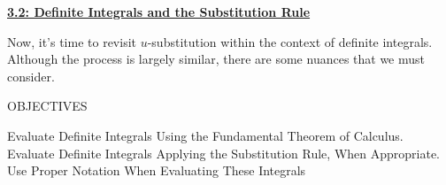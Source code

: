 \textbf{\underline{\large{3.2: Definite Integrals and the Substitution Rule}}} \par

Now, it's time to revisit $u$-substitution within the context of definite integrals. Although the process is largely similar, there are some nuances that we must consider. \par

\begin{tcolorbox}[objective]
    \begin{center}
        OBJECTIVES \\[11pt]
    \end{center}
    Evaluate Definite Integrals Using the Fundamental Theorem of Calculus. \\
    Evaluate Definite Integrals Applying the Substitution Rule, When Appropriate. \\
    Use Proper Notation When Evaluating These Integrals
\end{tcolorbox} \vspace{11pt}

